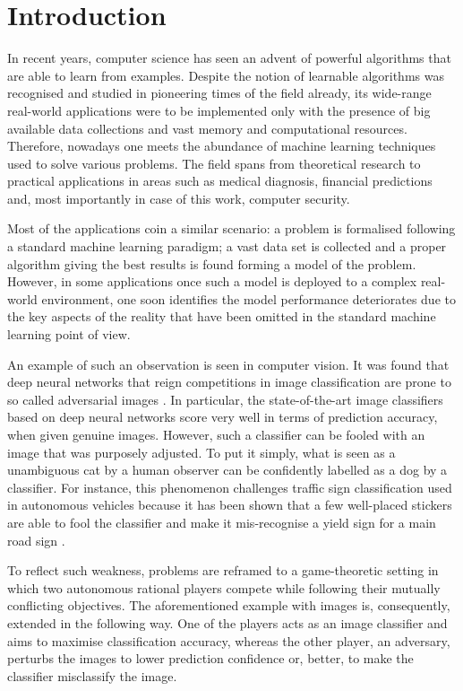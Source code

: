 \section{Introduction}

In recent years, computer science has seen an advent of powerful
algorithms that are able to learn from examples. Despite the notion of
learnable algorithms was recognised and studied in pioneering times of
the field already, its wide-range real-world applications were to be
implemented only with the presence of big available data collections and
vast memory and computational resources. Therefore, nowadays one meets
the abundance of machine learning techniques used to solve various
problems. The field spans from theoretical research to practical
applications in areas such as medical diagnosis, financial predictions
and, most importantly in case of this work, computer security.

Most of the applications coin a similar scenario: a problem is
formalised following a standard machine learning paradigm; a vast data
set is collected and a proper algorithm giving the best results is found
forming a model of the problem. However, in some applications once such
a model is deployed to a complex real-world environment, one soon
identifies the model performance deteriorates due to the key aspects of
the reality that have been omitted in the standard machine learning
point of view.

An example of such an observation is seen in computer vision. It was
found that deep neural networks that reign competitions in image
classification \cite{image_net} are prone to so called adversarial
images \cite{adversarial_examples}. In particular, the state-of-the-art image
classifiers based on deep neural networks score very well in terms of
prediction accuracy, when given genuine images. However, such a
classifier can be fooled with an image that was purposely adjusted. To
put it simply, what is seen as a unambiguous cat by a human observer can
be confidently labelled as a dog by a classifier. For instance, this
phenomenon challenges traffic sign classification used in autonomous
vehicles because it has been shown that a few well-placed stickers are
able to fool the classifier and make it mis-recognise a yield sign for a
main road sign \cite{adversarial_examples_2}.

To reflect such weakness, problems are reframed to a game-theoretic
setting in which two autonomous rational players compete while following
their mutually conflicting objectives. The aforementioned example with
images is, consequently, extended in the following way. One of the
players acts as an image classifier and aims to maximise classification
accuracy, whereas the other player, an adversary, perturbs the images to
lower prediction confidence or, better, to make the classifier
misclassify the image.

